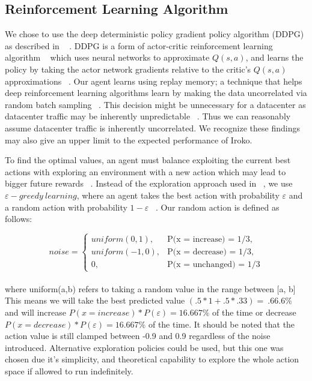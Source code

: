 \subsection{Reinforcement Learning Algorithm}

We chose to use the deep deterministic policy gradient
policy algorithm (DDPG) as described in ~\cite{DDPG} .
DDPG is a form of actor-critic reinforcement learning algorithm ~\cite{Sutton:1998:IRL:551283}
which uses neural networks to approximate $Q(s,a)$, and learns the policy by taking the actor
network gradients relative to the critic's $Q(s,a)$ approximations ~\cite{DDPG}.  Our agent learns using replay memory;
a technique that helps deep reinforcement learning algorithms learn by
making the data uncorrelated via random batch sampling ~\cite{DQLearning}.
This decision might be unnecessary for a datacenter as datacenter traffic may be inherently unpredictable ~\cite{microte}.
Thus we can reasonably assume datacenter traffic is inherently uncorrelated. We recognize these findings
may also give an upper limit to the expected performance of Iroko. 

To find the optimal values, an agent must balance exploiting
the current best actions with exploring an environment with 
a new action which may lead to bigger future rewards ~\cite{Sutton:1998:IRL:551283}.
Instead of the exploration approach used in ~\cite{DDPG}, we use $\varepsilon-greedy\ learning$,
where an agent takes the best action with probability $\varepsilon$ and a random action with probability
$1 - \varepsilon$ ~\cite{Sutton:1998:IRL:551283}. Our random action is defined as follows:

\[
noise = 
\begin{cases}

uniform(0,1), &\text{P(x = increase) = 1/3},\\
uniform(-1,0), &\text{P(x = decrease) = 1/3},\\
0, & \text{P(x = unchanged) = 1/3}
\end{cases}
\]
\\

where uniform(a,b) refers to taking a random value in the range between [a, b]
This means we will take the best predicted value $(.5 * 1 + .5 * .33) =  ~.66.6\%$  
and will increase $P(x= increase) * P(\varepsilon) = 16. 667\%$ of the time or
decrease $P(x= decrease) * P(\varepsilon) = 16. 667\%$ of the time.
It should be noted that the action value is still clamped between
-0.9 and 0.9 regardless of the noise introduced. Alternative exploration policies 
could be used, but this one was chosen due it's simplicity, and theoretical capability to explore the whole action space if allowed to run indefinitely.

